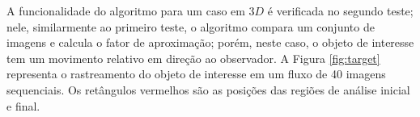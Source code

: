 A funcionalidade do algoritmo para um caso em $3D$ é verificada no segundo teste;
nele, similarmente ao primeiro teste, o algoritmo compara um conjunto de imagens 
e calcula o fator de aproximação; porém, neste caso, o objeto de interesse tem um movimento
relativo em direção ao observador. A Figura \ref{fig:target} representa o 
rastreamento  do objeto de interesse em um fluxo de 40 imagens sequenciais. Os retângulos vermelhos
são as posições das regiões de análise inicial e final.

